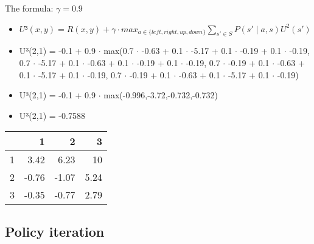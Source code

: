 \documentclass[colorlinks=true,linkcolor=blue]{article}
\begin{document}
The formula: $\gamma = 0.9$
\begin{itemize}
\item $U³(x,y) = R(x,y) + \gamma \cdot max_{a \in \{left,right,up,down\} } \sum_{s'\in S} P(s' \mid a,s) U^2(s')$
\item U³(2,1) = -0.1 + 0.9 $\cdot$ max(0.7 $\cdot$ -0.63 + 0.1 $\cdot$ -5.17 + 0.1 $\cdot$ -0.19 + 0.1 $\cdot$ -0.19, 0.7 $\cdot$ -5.17 + 0.1 $\cdot$ -0.63 + 0.1 $\cdot$ -0.19 + 0.1 $\cdot$ -0.19, 0.7 $\cdot$ -0.19 + 0.1 $\cdot$ -0.63 + 0.1 $\cdot$ -5.17 + 0.1 $\cdot$ -0.19, 0.7 $\cdot$ -0.19 + 0.1 $\cdot$ -0.63 + 0.1 $\cdot$ -5.17 + 0.1 $\cdot$ -0.19)
\item U³(2,1) = -0.1 + 0.9 $\cdot$ max(-0.996,-3.72,-0.732,-0.732)
\item U³(2,1) = -0.7588
\end{itemize}
\begin{center}
\begin{tabular}{r|r|r|r|}
 & 1 & 2 & 3\\
\hline
1 & 3.42 & 6.23 & 10\\
\hline
2 & -0.76 & -1.07 & 5.24\\
\hline
3 & -0.35 & -0.77 & 2.79\\
\hline
\end{tabular}
\end{center}

\subsection{Policy iteration}
\label{sec-5-2}
\end{document}
